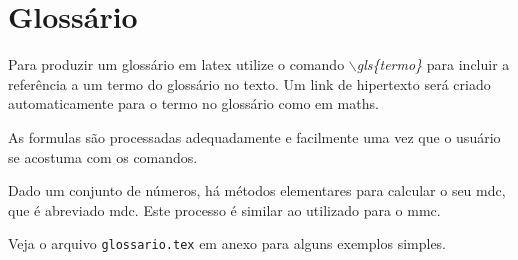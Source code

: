   \section{Glossário}\label{sec:glossario}
    Para produzir um glossário em \Gls{latex} utilize o comando \emph{$\backslash$gls\{termo\}} para incluir a referência a um termo do glossário no texto. Um link de hipertexto será criado automaticamente para o termo no glossário como em \gls{maths}.

    As \glspl{formula} são processadas adequadamente e facilmente uma vez que o usuário se acostuma com os comandos.

    Dado um conjunto de números, há métodos elementares para calcular o seu \acrlong{mdc}, que é abreviado \acrshort{mdc}. Este processo é similar ao utilizado para o \acrfull{mmc}.

    Veja o arquivo \texttt{glossario.tex} em anexo para alguns exemplos simples.
